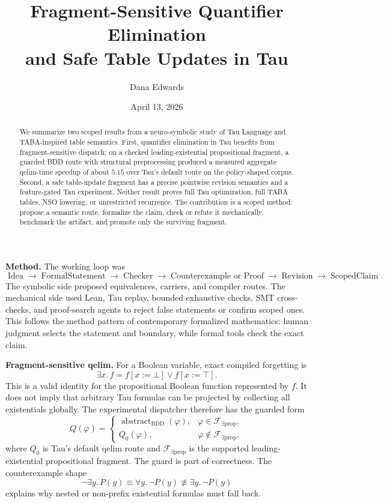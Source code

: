 \documentclass[10pt]{article}
\title{\vspace{-1.2em}Fragment-Sensitive Quantifier Elimination\\
and Safe Table Updates in Tau\vspace{-0.4em}}
\author{Dana Edwards}
\date{April 13, 2026}
\begin{document}
\maketitle
\vspace{-1.8em}

\begin{abstract}
\noindent
We summarize two scoped results from a neuro-symbolic study of Tau Language and
TABA-inspired table semantics. First, quantifier elimination in Tau benefits from
fragment-sensitive dispatch: on a checked leading-existential propositional
fragment, a guarded BDD route with structural preprocessing produced a measured
aggregate qelim-time speedup of about \(5.15\) over Tau's default route on the
policy-shaped corpus. Second, a safe table-update fragment has a precise pointwise
revision semantics and a feature-gated Tau experiment. Neither result proves
full Tau optimization, full TABA tables, NSO lowering, or unrestricted
recurrence. The contribution is a scoped method: propose a semantic route,
formalize the claim, check or refute it mechanically, benchmark the artifact,
and promote only the surviving fragment.
\end{abstract}

\textbf{Method.}
The working loop was
\[
\operatorname{Idea}\to\operatorname{FormalStatement}\to\operatorname{Checker}
\to\operatorname{Counterexample\ or\ Proof}\to
\operatorname{Revision}\to\operatorname{ScopedClaim}.
\]
The symbolic side proposed equivalences, carriers, and compiler routes. The
mechanical side used Lean, Tau replay, bounded exhaustive checks, SMT
cross-checks, and proof-search agents to reject false statements or confirm
scoped ones. This follows the method pattern of contemporary formalized
mathematics: human judgment selects the statement and boundary, while formal
tools check the exact claim.

\textbf{Fragment-sensitive qelim.}
For a Boolean variable, exact compiled forgetting is
\[
\exists x.\,f = f[x:=\bot]\vee f[x:=\top].
\]
This is a valid identity for the propositional Boolean function represented by
\(f\). It does not imply that arbitrary Tau formulas can be projected by
collecting all existentials globally. The experimental dispatcher therefore has
the guarded form
\[
Q(\varphi)=
\begin{cases}
\operatorname{abstract}_{\mathrm{BDD}}(\varphi),
& \varphi\in\mathcal{F}_{\exists\mathrm{prop}},\\
Q_0(\varphi),
& \varphi\notin\mathcal{F}_{\exists\mathrm{prop}},
\end{cases}
\]
where \(Q_0\) is Tau's default qelim route and
\(\mathcal{F}_{\exists\mathrm{prop}}\) is the supported leading-existential
propositional fragment. The guard is part of correctness. The counterexample
shape
\[
\neg\exists y.\,P(y)\equiv \forall y.\,\neg P(y)\not\equiv
\exists y.\,\neg P(y)
\]
explains why nested or non-prefix existential formulas must fall back.
\end{document}
